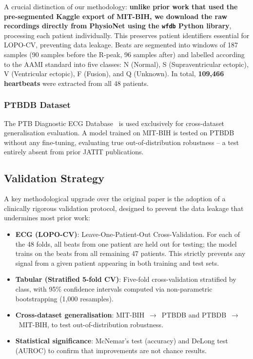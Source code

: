 \documentclass[10pt, twocolumn]{article}
\begin{document}
A crucial distinction of our methodology: \textbf{unlike prior work that used the
pre-segmented Kaggle export of MIT-BIH, we download the raw recordings directly from
PhysioNet using the \texttt{wfdb} Python library}, processing each patient individually.
This preserves patient identifiers essential for LOPO-CV, preventing data leakage.
Beats are segmented into windows of 187 samples (90 samples before the R-peak,
96 samples after) and labelled according to the AAMI standard into five classes:
N (Normal), S (Supraventricular ectopic), V (Ventricular ectopic), F (Fusion), and Q (Unknown).
In total, \textbf{109,466 heartbeats} were extracted from all 48 patients.

\subsubsection{PTBDB Dataset}

The PTB Diagnostic ECG Database~\cite{kaggle_heartbeat} is used exclusively for
cross-dataset generalisation evaluation.
A model trained on MIT-BIH is tested on PTBDB without any fine-tuning, evaluating
true out-of-distribution robustness -- a test entirely absent from prior JATIT publications.

\subsection{Validation Strategy}

A key methodological upgrade over the original paper is the adoption of a clinically
rigorous validation protocol, designed to prevent the data leakage that undermines most
prior work:

\begin{itemize}[leftmargin=*]
  \item \textbf{ECG (LOPO-CV)}: Leave-One-Patient-Out Cross-Validation.
        For each of the 48 folds, all beats from one patient are held out for testing;
        the model trains on the beats from all remaining 47 patients.
        This strictly prevents any signal from a given patient appearing in both training
        and test sets.
  \item \textbf{Tabular (Stratified 5-fold CV)}: Five-fold cross-validation stratified
        by class, with 95\% confidence intervals computed via non-parametric bootstrapping
        (1,000 resamples).
  \item \textbf{Cross-dataset generalisation}: MIT-BIH~$\to$~PTBDB and PTBDB~$\to$~MIT-BIH,
        to test out-of-distribution robustness.
  \item \textbf{Statistical significance}: McNemar's test (accuracy) and DeLong test (AUROC)
        to confirm that improvements are not chance results.
\end{itemize}
\end{document}
